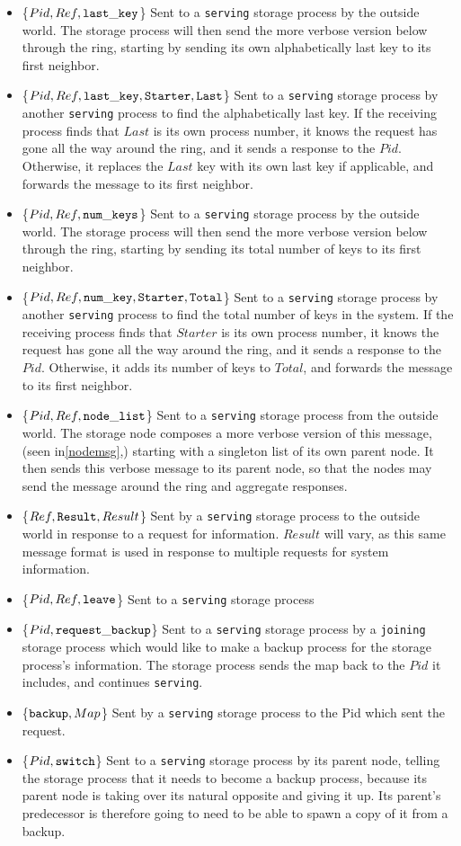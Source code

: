 \documentclass[a4paper]{article}
\begin{document}
\begin{itemize}
\item\{$Pid, Ref, {\tt last\_key}$\} Sent to a {\tt serving} storage process by the outside world. The storage process will then send the more verbose version below through the ring, starting by sending its own alphabetically last key to its first neighbor.
\item\{$Pid, Ref, {\tt last\_key, Starter, Last}$\} Sent to a {\tt serving} storage process by another {\tt serving} process to find the alphabetically last key. If the receiving process finds that $Last$ is its own process number, it knows the request has gone all the way around the ring, and it sends a response to the $Pid$. Otherwise, it replaces the $Last$ key with its own last key if applicable, and forwards the message to its first neighbor.
\item\{$Pid, Ref, {\tt num\_keys}$\} Sent to a {\tt serving} storage process by the outside world. The storage process will then send the more verbose version below through the ring, starting by sending its total number of keys to its first neighbor.
\item\{$Pid, Ref, {\tt num\_key, Starter, Total}$\} Sent to a {\tt serving} storage process by another {\tt serving} process to find the total number of keys in the system. If the receiving process finds that $Starter$ is its own process number, it knows the request has gone all the way around the ring, and it sends a response to the $Pid$. Otherwise, it adds its number of keys to $Total$, and forwards the message to its first neighbor.
\item\{$Pid, Ref, {\tt node\_list}$\} Sent to a {\tt serving} storage process from the outside world. The storage node composes a more verbose version of this message, (seen in\ref{nodemsg},) starting with a singleton list of its own parent node. It then sends this verbose message to its parent node, so that the nodes may send the message around the ring and aggregate responses.
\item\{$Ref, {\tt Result}, Result$\} Sent by a {\tt serving} storage process to the outside world in response to a request for information.  $Result$ will vary, as this same message format is used in response to multiple requests for system information.
\item\{$Pid, Ref, {\tt leave}$\} Sent to a {\tt serving} storage process
\item\{$Pid, {\tt request\_backup}$\} Sent to a {\tt serving} storage process by a {\tt joining} storage process which would like to make a backup process for the storage process's information. The storage process sends the map back to the $Pid$ it includes, and continues {\tt serving}.
\item\{${\tt backup}, Map$\} Sent by a {\tt serving} storage process to the Pid which sent the request.
\item\{$Pid, {\tt switch}$\} Sent to a {\tt serving} storage process by its parent node, telling the storage process that it needs to become a backup process, because its parent node is taking over its natural opposite and giving it up. Its parent's predecessor is therefore going to need to be able to spawn a copy of it from a backup.
\end{itemize}
\end{document}
